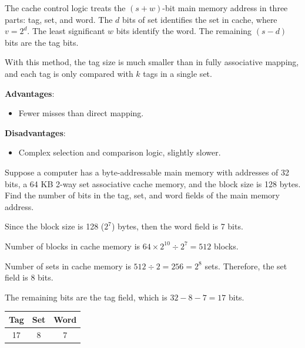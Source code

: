 \begin{enumerate}
    The cache control logic treats the $(s+w)$-bit main memory address in three parts:
    tag, set, and word.
    The $d$ bits of set identifies the set in cache, where $v = 2^d$.
    The least significant $w$ bits identify the word.
    The remaining $(s-d)$ bits are the tag bits.

    With this method, the tag size is much smaller than in fully associative mapping,
    and each tag is only compared with $k$ tags in a single set.

    \begin{multicols}{2}
        \textbf{Advantages}: \begin{itemize}
            \item Fewer misses than direct mapping.
        \end{itemize}
        \columnbreak
        \textbf{Disadvantages}: \begin{itemize}
            \item Complex selection and comparison logic, slightly slower.
        \end{itemize}
    \end{multicols}

\end{enumerate}

\begin{example}
    Suppose a computer has a byte-addressable main memory with addresses of 32 bits,
    a 64 KB 2-way set associative cache memory, and the block size is 128 bytes. Find
    the number of bits in the tag, set, and word fields of the main memory address.

    \begin{solution}
    Since the block size is 128 ($2^7$) bytes, then the word field is 7 bits.

    Number of blocks in cache memory is $64 \times 2^{10} \div 2^7 = 512$ blocks.

    Number of sets in cache memory is $512 \div 2 = 256 = 2^8$ sets. Therefore, the set
    field is 8 bits.

    The remaining bits are the tag field, which is $32 - 8 - 7 = 17$ bits.

    \begin{table}[H]
        \centering
        \begin{tabular}{|c|c|c|}
            \hline
            \textbf{Tag} & \textbf{Set} & \textbf{Word} \\ \hline
            17 & 8 & 7 \\ \hline
        \end{tabular}
    \end{table}
    \end{solution}
\end{example}